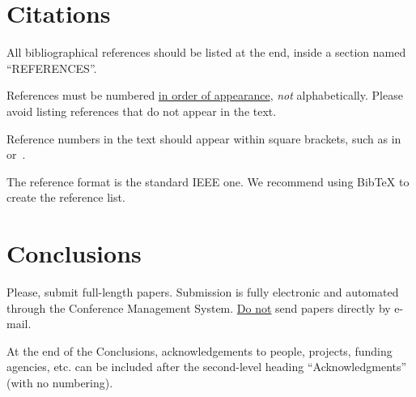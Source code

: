 \documentclass{article}
\begin{document}

\section{Citations}
All bibliographical references should be listed at the end, inside a section named ``REFERENCES''.

References must be numbered {\ul {in order of appearance}}, {\em not} alphabetically. Please avoid listing references that do not appear in the text.

Reference numbers in the text should appear within square brackets, such as 
in~\cite{Someone:09} or~\cite{Someone:04,Someone:13}.

The reference format is the standard IEEE one. We recommend using BibTeX to create the reference list.


\section{Conclusions}
Please, submit full-length papers. Submission is fully electronic and automated through the Conference Management System. 
{\ul{Do not}} send papers directly by e-mail.

\begin{acknowledgments}
At the end of the Conclusions, acknowledgements to people, projects, funding agencies, etc. can be included after the second-level heading ``Acknowledgments'' (with no numbering).
\end{acknowledgments} 


\end{document}
